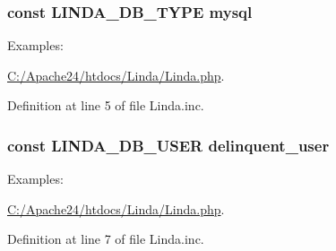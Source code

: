 \subsubsection[{L\+I\+N\+D\+A\+\_\+\+D\+B\+\_\+\+T\+Y\+P\+E}]{\setlength{\rightskip}{0pt plus 5cm}const L\+I\+N\+D\+A\+\_\+\+D\+B\+\_\+\+T\+Y\+P\+E \textquotesingle{}mysql\textquotesingle{}}\label{_linda_8inc_a75c0048bcb27b8bf9d4e9fd1b9eb023b}
\begin{Desc}
\item[Examples\+: ]\par
\hyperlink{_c_1_2_apache24_2htdocs_2_linda_2_linda_8php-example}{C\+:/\+Apache24/htdocs/\+Linda/\+Linda.\+php}.\end{Desc}


Definition at line 5 of file Linda.\+inc.

\hypertarget{_linda_8inc_a713707c7fea371f7f3892136c1e852f0}{}
\subsubsection[{L\+I\+N\+D\+A\+\_\+\+D\+B\+\_\+\+U\+S\+E\+R}]{\setlength{\rightskip}{0pt plus 5cm}const L\+I\+N\+D\+A\+\_\+\+D\+B\+\_\+\+U\+S\+E\+R \textquotesingle{}delinquent\+\_\+user\textquotesingle{}}\label{_linda_8inc_a713707c7fea371f7f3892136c1e852f0}
\begin{Desc}
\item[Examples\+: ]\par
\hyperlink{_c_1_2_apache24_2htdocs_2_linda_2_linda_8php-example}{C\+:/\+Apache24/htdocs/\+Linda/\+Linda.\+php}.\end{Desc}


Definition at line 7 of file Linda.\+inc.

